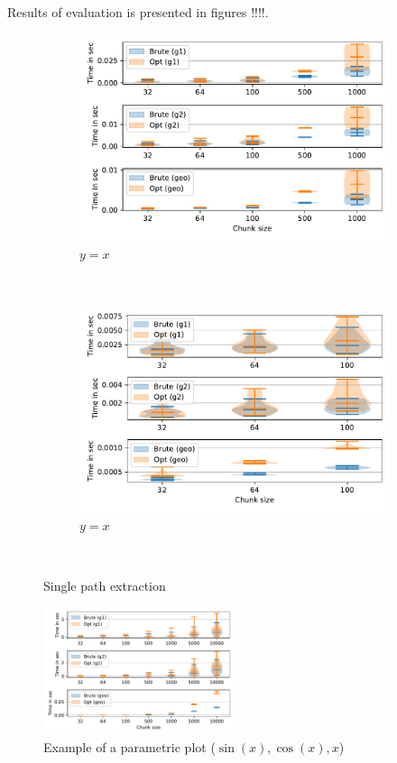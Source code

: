 Results of evaluation is presented in figures !!!!.
\begin{figure}
     \begin{subfigure}[b]{0.24\textwidth}
         \centering
         \includegraphics[width=\textwidth]{data/raw/core.pdf}
         \caption{$y=x$}
         \label{fig:y equals x}
     \end{subfigure}
     ~\begin{subfigure}[b]{0.24\textwidth}
         \centering
         \includegraphics[width=\textwidth]{data/raw/core_3.pdf}
         \caption{$y=x$}
         \label{fig:y equals x}
     \end{subfigure}\\
   \caption{Single path extraction}
\end{figure}


\begin{figure}[h]
\centering
\includegraphics[width=0.5\textwidth]{data/raw/go.pdf}
\caption{Example of a parametric plot ($\sin (x), \cos(x), x$)}
\end{figure}

